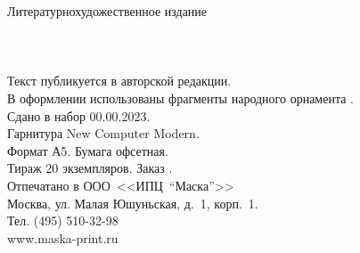 {
\newpage
\thispagestyle{empty}
\begin{center}
{\small Литературно\sdash художественное издание}\\
\vspace{1.6cm}
{\Large \MyVarAuthorName}\\
\vspace{1.6cm}
{\Large\textbf\MyVarBookName}\\
\vspace{0.4cm}
{\large\textbf\MyVarBookNamesec}\\
\vspace{1.0cm}
{\small%
Текст публикуется в авторской редакции.\\
\vspace{1.0cm}
В оформлении использованы фрагменты народного орнамента \cite{КарельскаяВышивка,Королькова}.\\
\vspace{1.5cm}
Сдано в набор 00.00.2023.\\
Гарнитура New Computer Modern.\\
Формат А5. Бумага офсетная.\\
Тираж 20 экземпляров. Заказ .\\
\vspace{1.0cm}
Отпечатано в ООО~<<ИПЦ~"`Маска"'>>\\
Москва, ул. Малая Юшуньская, д.~1, корп.~1.\\
Тел. (495) 510-32-98\\
www.maska-print.ru
}
\end{center}
}